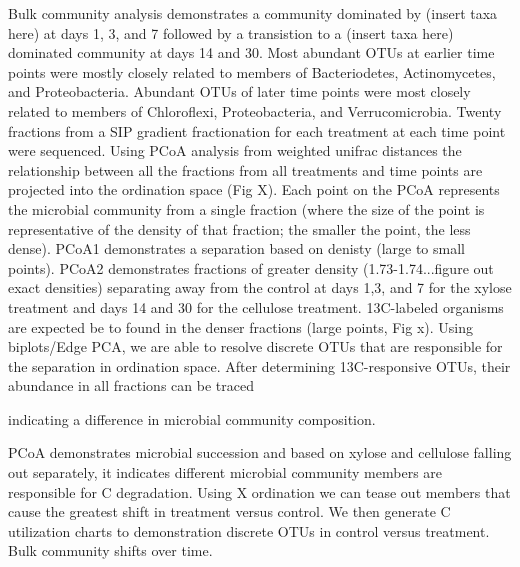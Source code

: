 Bulk community analysis demonstrates a community dominated by (insert taxa here) at days 1, 3, and 7 followed by a transistion to a (insert taxa here) dominated community at days 14 and 30. Most abundant OTUs at earlier time points were mostly closely related to members of Bacteriodetes, Actinomycetes, and Proteobacteria.  Abundant OTUs of later time points were most closely related to members of Chloroflexi, Proteobacteria, and Verrucomicrobia.  Twenty fractions from a SIP gradient fractionation for each treatment at each time point were sequenced.  Using PCoA analysis from weighted unifrac distances the relationship between all the fractions from all treatments and time points are projected into the ordination space (Fig X).  Each point on the PCoA represents the microbial community from a single fraction (where the size of the point is representative of the density of that fraction; the smaller the point, the less dense). PCoA1 demonstrates a separation based on denisty (large to small points).  PCoA2 demonstrates fractions of greater density (1.73-1.74...figure out exact densities) separating away from the control at days 1,3, and 7 for the xylose treatment and days 14 and 30 for the cellulose treatment.  13C-labeled organisms are expected be to found in the denser fractions (large points, Fig x).  Using biplots/Edge PCA, we are able to resolve discrete OTUs that are responsible for the separation in ordination space.  After determining 13C-responsive OTUs, their abundance in all fractions can be traced  
  
  indicating a difference in microbial community composition. 
         

PCoA demonstrates microbial succession and based on xylose and cellulose falling out separately, it indicates different microbial community members are responsible for C degradation.  Using X ordination we can tease out members that cause the greatest shift in treatment versus control.  We then generate C utilization charts to demonstration discrete OTUs in control versus treatment.  Bulk community shifts over time.  